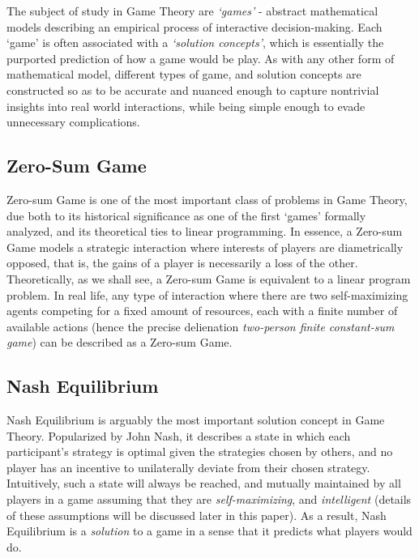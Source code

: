 \documentclass[journal, 11pt, a4paper, twoside]{IEEEtran}
\begin{document}
The subject of study in Game Theory are \textit{`games'} - abstract mathematical models describing an empirical process of interactive decision-making. Each `game' is often associated with a \textit{`solution concepts'}, which is essentially the purported prediction of how a game would be play. As with any other form of mathematical model, different types of game, and solution concepts are constructed so as to be accurate and nuanced enough to capture nontrivial insights into real world interactions, while being simple enough to evade unnecessary complications.
\subsection{Zero-Sum Game}
Zero-sum Game is one of the most important class of problems in Game Theory, due both to its historical significance as one of the first `games' formally analyzed, and its theoretical ties to linear programming. In essence, a Zero-sum Game models a strategic interaction where interests of players are diametrically opposed, that is, the gains of a player is necessarily a loss of the other. Theoretically, as we shall see, a Zero-sum Game is equivalent to a linear program problem. In real life, any type of interaction where there are two self-maximizing agents competing for a fixed amount of resources, each with a finite number of available actions (hence the precise delienation \textit{two-person finite constant-sum game}) can be described as a Zero-sum Game.


\subsection{Nash Equilibrium}
Nash Equilibrium is arguably the most important solution concept in Game Theory. Popularized by John Nash, it describes a state in which each participant's strategy is optimal given the strategies chosen by others, and no player has an incentive to unilaterally deviate from their chosen strategy. Intuitively, such a state will always be reached, and mutually maintained by all players in a game assuming that they are \textit{self-maximizing}, and \textit{intelligent} (details of these assumptions will be discussed later in this paper). As a result, Nash Equilibrium is a \textit{solution} to a game in a sense that it predicts what players would do.
\end{document}
